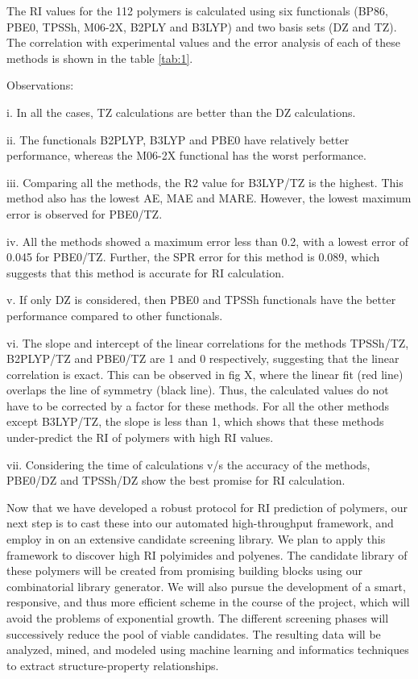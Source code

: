 The RI values for the 112 polymers is calculated using six functionals (BP86, PBE0, TPSSh, M06-2X, B2PLY and B3LYP) and two basis sets (DZ and TZ). The correlation with experimental values and the error analysis of each of these methods is shown in the table \ref{tab:1}. 

Observations:

i. In all the cases, TZ calculations are better than the DZ calculations. 

ii. The functionals B2PLYP, B3LYP and PBE0 have relatively better performance, whereas the M06-2X functional has the worst performance. 

iii. Comparing all the methods, the R2 value for B3LYP/TZ is the highest. This method also has the lowest AE, MAE and MARE. However, the lowest maximum error is observed for PBE0/TZ. 

iv. All the methods showed a maximum error less than 0.2, with a lowest error of 0.045 for PBE0/TZ. Further, the SPR error for this method is 0.089, which suggests that this method is accurate for RI calculation. 

v. If only DZ is considered, then PBE0 and TPSSh functionals have the better performance compared to other functionals. 

vi. The slope and intercept of the linear correlations for the methods TPSSh/TZ, B2PLYP/TZ and PBE0/TZ are 1 and 0 respectively, suggesting that the linear correlation is exact. This can be observed in fig X, where the linear fit (red line) overlaps the line of symmetry (black line).  Thus, the calculated values do not have to be corrected by a factor for these methods. For all the other methods except B3LYP/TZ, the slope is less than 1, which shows that these methods under-predict the RI of polymers with high RI values.

vii. Considering the time of calculations v/s the accuracy of the methods, PBE0/DZ and TPSSh/DZ show the best promise for RI calculation. 

Now that we have developed a robust protocol for RI prediction of polymers, our next step is to cast these into our automated high-throughput framework, and employ in on an extensive candidate screening library. We plan to apply this framework to discover high RI polyimides and polyenes. The candidate library of these polymers will be created from promising building blocks using our combinatorial library generator. We will also pursue the development of a smart, responsive, and thus more efficient scheme in the course of the project, which will avoid the problems of exponential growth. The different screening phases will successively reduce the pool of viable candidates. The resulting data will be analyzed, mined, and modeled using machine learning and informatics techniques to extract structure-property relationships.



